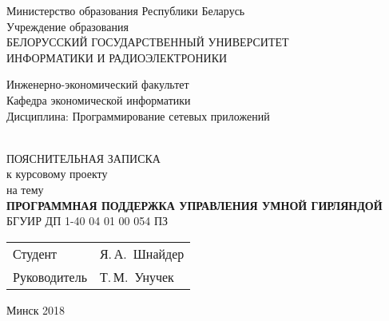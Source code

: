 \begin{titlepage}
  \begin{center}
    Министерство образования Республики Беларусь\\[1em]
    Учреждение образования\\
    БЕЛОРУССКИЙ ГОСУДАРСТВЕННЫЙ УНИВЕРСИТЕТ \\
    ИНФОРМАТИКИ И РАДИОЭЛЕКТРОНИКИ\\[1em]

    \begin{minipage}{\textwidth}
      \begin{flushleft}
          Инженерно-экономический факультет\\
          Кафедра экономической информатики\\
          Дисциплина: Программирование сетевых приложений
      \end{flushleft}
    \end{minipage}\\[3em]

    {ПОЯСНИТЕЛЬНАЯ ЗАПИСКА}\\
    {к курсовому проекту}\\
    {на тему}\\[3em]
    \textbf{\large\MakeUppercase{Программная поддержка управления \newline умной гирляндой}}\\[1em]


    {БГУИР ДП  1-40 04 01 00 054 ПЗ}\\[2em]
    
    \begin{tabular}{ p{}p{} }
      Студент & Я.\,А.~Шнайдер \\
      Руководитель & Т.\,М.~Унучек
    \end{tabular}
    
    \vfill
    {\normalsize Минск 2018}
  \end{center}
\end{titlepage}
